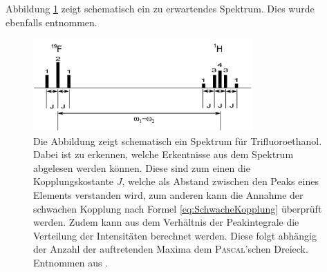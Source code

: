 Abbildung \ref{fig:JKSchema} zeigt schematisch ein zu erwartendes Spektrum. Dies wurde ebenfalls \cite{Schmidt} entnommen.
\begin{figure}[H]
    \centering
    \includegraphics[width= 0.75\textwidth]{Abbildungen/JKopplungSchema.png} 
    \caption[Schematische Darstellung eines Spektrums zur veranschaulichung der erwartbaren Ergebnisse durch die Analyse der J-Kopplung. Entnommen aus \cite{Schmidt}.]{Die Abbildung zeigt schematisch ein Spektrum für Trifluoroethanol.
    Dabei ist zu erkennen, welche Erkentnisse aus dem Spektrum abgelesen werden können.
    Diese sind zum einen die Kopplungskostante $J$, welche als Abstand zwischen den Peaks eines Elements verstanden wird, zum anderen kann die Annahme der schwachen Kopplung nach Formel \eqref{eq:SchwacheKopplung} überprüft werden.
    Zudem kann aus dem Verhältnis der Peakintegrale die Verteilung der Intensitäten berechnet werden.
    Diese folgt abhängig der Anzahl der auftretenden Maxima dem \textsc{Pascal}'schen Dreieck. Entnommen aus \cite{Schmidt}.}
    \label{fig:JKSchema}
\end{figure}

